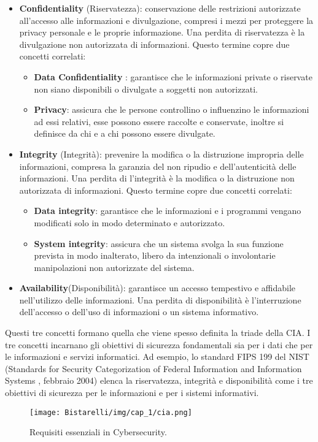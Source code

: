 \begin{itemize}
    \item \textbf{Confidentiality} (Riservatezza):  conservazione delle restrizioni autorizzate all'accesso alle informazioni e divulgazione, compresi i mezzi per proteggere la privacy personale e le proprie informazione. Una perdita di riservatezza è la divulgazione non autorizzata di informazioni. Questo termine copre due concetti correlati:
    \begin{itemize}
        \item  \textbf{Data Confidentiality} : garantisce che le informazioni private o riservate non siano disponibili o divulgate a soggetti non autorizzati.
        \item \textbf{Privacy}: assicura che le persone controllino o influenzino le informazioni
        ad essi relativi, esse possono essere raccolte e conservate, inoltre si definisce da chi e a chi possono essere divulgate.
    \end{itemize}
    \item \textbf{Integrity} (Integrità): prevenire la modifica o la distruzione impropria delle informazioni, compresa la garanzia del non ripudio e dell'autenticità delle informazioni. Una perdita di l'integrità è la modifica o la distruzione non autorizzata di informazioni. Questo termine copre due concetti correlati:
    \begin{itemize}
        \item \textbf{Data integrity}:  garantisce che le informazioni e i programmi vengano modificati solo in modo determinato e autorizzato.
        \item \textbf{System integrity}: assicura che un sistema svolga la sua funzione prevista in modo inalterato, libero da intenzionali o involontarie manipolazioni non autorizzate del sistema.
    \end{itemize}
    \item \textbf{Availability}(Disponibilità): garantisce un accesso tempestivo e affidabile nell'utilizzo delle informazioni. Una perdita di disponibilità è l'interruzione dell'accesso o dell'uso di informazioni o un sistema informativo.
\end{itemize} 

\noindent
Questi tre concetti formano quella che viene spesso definita la triade della CIA. I tre
concetti incarnano gli obiettivi di sicurezza fondamentali sia per i dati che per le informazioni
e servizi informatici. Ad esempio, lo standard FIPS 199 del NIST (Standards for Security
Categorization of Federal Information and Information Systems , febbraio 2004) elenca la riservatezza, integrità e disponibilità come i tre obiettivi di sicurezza per le informazioni e
per i sistemi informativi.
\begin{figure}[H]
	\centering
    \texttt{[image: Bistarelli/img/cap\_1/cia.png]}
	\caption{Requisiti essenziali in Cybersecurity.}\label{fig:cia}
\end{figure}

